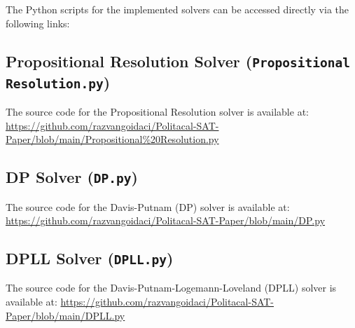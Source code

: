 \documentclass[11pt, a4paper]{article}
\begin{document}
The Python scripts for the implemented solvers can be accessed directly via the following links:

\subsection{Propositional Resolution Solver (\texttt{Propositional Resolution.py})} \label{app:resolution_code}
The source code for the Propositional Resolution solver is available at:
\url{https://github.com/razvangoidaci/Politacal-SAT-Paper/blob/main/Propositional%20Resolution.py}

\subsection{DP Solver (\texttt{DP.py})} \label{app:dp_code}
The source code for the Davis-Putnam (DP) solver is available at:
\url{https://github.com/razvangoidaci/Politacal-SAT-Paper/blob/main/DP.py}

\subsection{DPLL Solver (\texttt{DPLL.py})} \label{app:dpll_code}
The source code for the Davis-Putnam-Logemann-Loveland (DPLL) solver is available at:
\url{https://github.com/razvangoidaci/Politacal-SAT-Paper/blob/main/DPLL.py}

\end{document}

